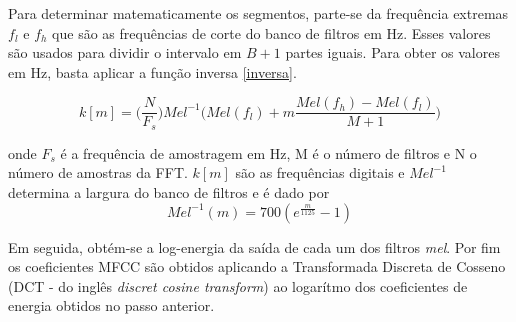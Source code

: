 Para determinar matematicamente os segmentos, parte-se da frequência extremas $f_l$ e $f_h$ que são as frequências de corte do banco de filtros em Hz. Esses valores são usados para dividir o intervalo em $B+1$ partes iguais. Para obter os valores em Hz, basta aplicar a função inversa \ref{inversa}.

\begin{equation}
\label{inversa}
k[m] = \big( \frac{N}{F_s}\big) Mel^{-1} \big(Mel(f_l) + m \frac{Mel(f_h)- Mel(f_l)}{M+1}\big)
\end{equation}

onde $F_s$ é a frequência de amostragem em Hz, M é o número de filtros e N o número de amostras da FFT. $k[m]$ são as frequências digitais e $Mel^{-1}$ determina a largura do banco de filtros e é dado por
\begin{equation}
Mel^{-1}(m) = 700(e^{\frac{m}{1125}} - 1)
\end{equation}



Em seguida, obtém-se a log-energia da saída de cada um dos filtros \textit{mel}. Por fim os coeficientes MFCC são obtidos aplicando a  Transformada Discreta de Cosseno (DCT - do inglês \textit{discret cosine transform}) ao logarítmo dos coeficientes de energia obtidos no passo anterior.





























